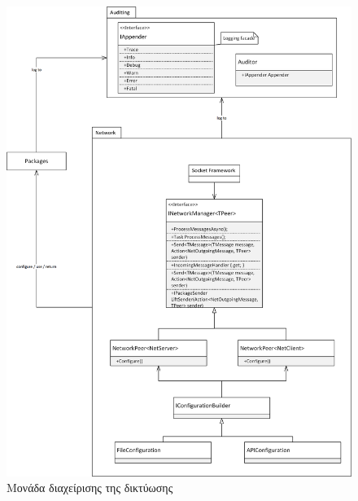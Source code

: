 			\begin{figure}
				\centering
				\includegraphics[width=165mm]{Images/network_architecture_networking}
				\caption{Μονάδα διαχείρισης της δικτύωσης}
				\label{networking_module}
			\end{figure}		
	\newpage
